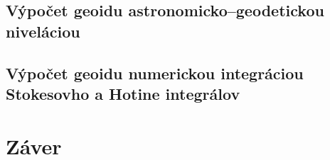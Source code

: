 \documentclass[a4paper, 12pt]{book}
\begin{document}

\section{Výpočet geoidu astronomicko--geodetickou niveláciou}







\section{Výpočet geoidu numerickou integráciou Stokesovho a Hotine integrálov}







\chapter*{Záver}









\end{document}
